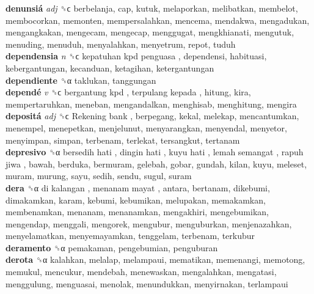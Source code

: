 \textbf{denunsiá} \emph{adj}  ␝ϲ  berbelanja, cap, kutuk, melaporkan, melibatkan, membelot, membocorkan, memonten, mempersalahkan, mencema, mendakwa, mengadukan, mengangkakan, mengecam, mengecap, menggugat, mengkhianati, mengutuk, menuding, menuduh, menyalahkan, menyetrum, repot, tuduh  \\
\textbf{dependensia} \emph{n}  ␝ϲ   kepatuhan kpd penguasa , dependensi, habituasi, kebergantungan, kecanduan, ketagihan, ketergantungan  \\
\textbf{dependiente} ␝α  taklukan, tanggungan  \\
\textbf{dependé} \emph{v}  ␝ϲ   bergantung kpd ,  terpulang kepada , hitung, kira, mempertaruhkan, meneban, mengandalkan, menghisab, menghitung, mengira  \\
\textbf{depositá} \emph{adj}  ␝ϲ   Rekening bank , berpegang, kekal, melekap, mencantumkan, menempel, menepetkan, menjelunut, menyarangkan, menyendal, menyetor, menyimpan, simpan, terbenam, terlekat, tersangkut, tertanam  \\
\textbf{depresivo} ␝α   bersedih hati ,  dingin hati ,  kuyu hati ,  lemah semangat ,  rapuh jiwa , bawah, berduka, bermuram, gelebah, gobar, gundah, kilan, kuyu, meleset, muram, murung, sayu, sedih, sendu, sugul, suram  \\
\textbf{dera} ␝α   di kalangan ,  menanam mayat , antara, bertanam, dikebumi, dimakamkan, karam, kebumi, kebumikan, melupakan, memakamkan, membenamkan, menanam, menanamkan, mengakhiri, mengebumikan, mengendap, menggali, mengorek, mengubur, menguburkan, menjenazahkan, menyelamatkan, menyemayamkan, tenggelam, terbenam, terkubur  \\
\textbf{deramento} ␝α  pemakaman, pengebumian, penguburan  \\
\textbf{derota} ␝α  kalahkan, melalap, melampaui, mematikan, memenangi, memotong, memukul, mencukur, mendebah, menewaskan, mengalahkan, mengatasi, menggulung, menguasai, menolak, menundukkan, menyirnakan, terlampaui  \\
